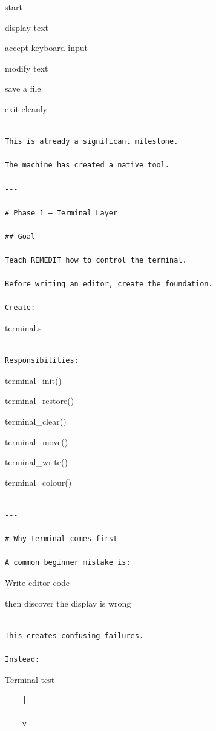 \documentclass[
  oneside,
  openany]{book}
\begin{document}
start

display text

accept keyboard input

modify text

save a file

exit cleanly

\begin{verbatim}

This is already a significant milestone.

The machine has created a native tool.

---

# Phase 1 — Terminal Layer

## Goal

Teach REMEDIT how to control the terminal.

Before writing an editor, create the foundation.

Create:
\end{verbatim}

terminal.s

\begin{verbatim}

Responsibilities:
\end{verbatim}

terminal\_init()

terminal\_restore()

terminal\_clear()

terminal\_move()

terminal\_write()

terminal\_colour()

\begin{verbatim}

---

# Why terminal comes first

A common beginner mistake is:
\end{verbatim}

Write editor code

then discover the display is wrong

\begin{verbatim}

This creates confusing failures.

Instead:
\end{verbatim}

Terminal test

\begin{verbatim}
    |

    v
\end{verbatim}
\end{document}
